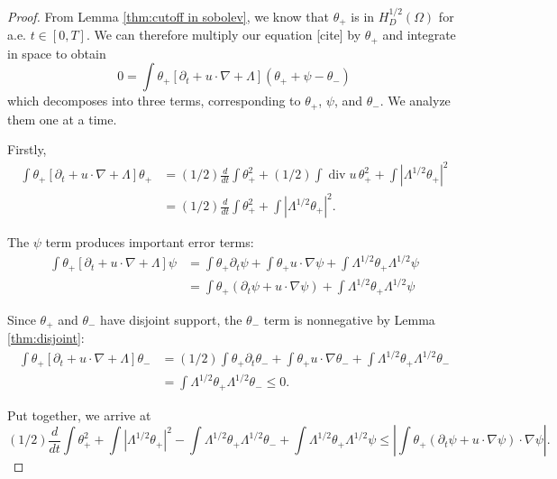 \documentclass[11pt]{amsart}
\theoremstyle{remark}
\theoremstyle{definition}
\newcommand{\paren}[1]{\left( #1 \right)}
\newcommand{\bracket}[1]{\left[ #1 \right]}
\newcommand{\abs}[1]{\left\lvert #1 \right\rvert}
\newcommand{\del}{\partial}
\newcommand{\grad}{\nabla}
\newcommand{\ddt}{\frac{d}{dt}}
\renewcommand{\div}{\operatorname{div}}
\begin{document}
\begin{proof}
From Lemma \ref{thm:cutoff in sobolev}, we know that $\theta_+$ is in $H_D^{1/2}(\Omega)$ for a.e. $t \in [0,T]$.  We can therefore multiply our equation [cite] by $\theta_+$ and integrate in space to obtain
\[ 0 = \int \theta_+ \bracket{ \del_t + u \cdot \grad + \Lambda } \paren{\theta_+ + \psi - \theta_-} \]
which decomposes into three terms, corresponding to $\theta_+$, $\psi$, and $\theta_-$.  We analyze them one at a time.  

Firstly,
\begin{align*} 
\int \theta_+ \bracket{ \del_t + u \cdot \grad + \Lambda } \theta_+ &= (1/2) \ddt \int \theta_+^2 + (1/2) \int \div u \, \theta_+^2 + \int \abs{\Lambda^{1/2} \theta_+}^2
\\ &= (1/2) \ddt \int \theta_+^2 + \int \abs{\Lambda^{1/2} \theta_+}^2.
\end{align*}

The $\psi$ term produces important error terms:
\begin{align*} 
\int \theta_+ \bracket{ \del_t + u \cdot \grad + \Lambda } \psi &= \int \theta_+ \del_t \psi + \int \theta_+ u \cdot \grad \psi + \int \Lambda^{1/2} \theta_+ \Lambda^{1/2} \psi
\\ &= \int \theta_+ (\del_t \psi + u \cdot \grad \psi) + \int \Lambda^{1/2} \theta_+ \Lambda^{1/2} \psi
\end{align*}

Since $\theta_+$ and $\theta_-$ have disjoint support, the $\theta_-$ term is nonnegative by Lemma \ref{thm:disjoint}:
\begin{align*} 
\int \theta_+ \bracket{ \del_t + u \cdot \grad + \Lambda } \theta_- &= (1/2) \int \theta_+ \del_t \theta_- + \int \theta_+ u \cdot \grad \theta_- + \int \Lambda^{1/2} \theta_+ \Lambda^{1/2} \theta_-
\\ &= \int \Lambda^{1/2} \theta_+ \Lambda^{1/2} \theta_- \leq 0.
\end{align*}

Put together, we arrive at 
\[ (1/2) \ddt \int \theta_+^2 + \int \abs{\Lambda^{1/2} \theta_+}^2 - \int \Lambda^{1/2}\theta_+ \Lambda^{1/2} \theta_- + \int \Lambda^{1/2} \theta_+ \Lambda^{1/2} \psi \leq \abs{\int \theta_+ (\del_t \psi + u \cdot \grad \psi) \cdot \grad \psi}. \]


\end{proof}
\end{document}
